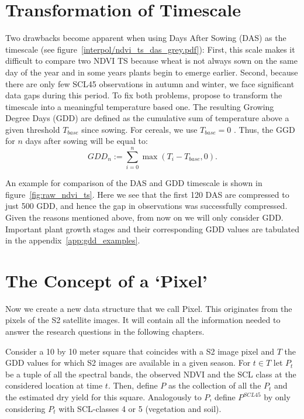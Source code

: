 \section{Transformation of Timescale}\label{sec:gdd_def}
	{%
		Two drawbacks become apparent when using Days After Sowing (DAS) as the timescale (see figure~\ref{interpol/ndvi_ts_das_grey.pdf}): First, this scale makes it difficult to compare two NDVI {TS} because wheat is not always sown on the same day of the year and in some years plants begin to emerge earlier. Second, because there are only few SCL45 observations in autumn and winter, we face significant data gaps during this period. To fix both problems, \cite{mcmasterGrowingDegreedaysOne1997} propose to transform the timescale into a meaningful temperature based one. The resulting Growing Degree Days ({GDD}) are defined as the cumulative sum of temperature above a given threshold $T_{base}$ since sowing. For cereals, we use $T_{base}=0$ \citep{holzkamperSpatialTemporalTrends2015}. Thus, the GGD for $n$ days after sowing will be equal to:
		\begin{equation}
			\label{eq:gdd}
			GDD_n := \sum_{i=0}^n \max(T_i - T_{base}, 0).
		\end{equation}

        An example for comparison of the DAS and GDD timescale is shown in figure~\ref{fig:raw_ndvi_ts}. Here we see that the first 120 DAS are compressed to just 500 GDD, and hence the gap in observations was successfully compressed. Given the reasons mentioned above, from now on we will only consider GDD. 
        Important plant growth stages and their corresponding GDD values are tabulated in the appendix~\ref{app:gdd_examples}.
	} 

\section{The Concept of a `Pixel'}{ \label{sec:gather_data_to_pixel}
	Now we create a new data structure that we call Pixel. This originates from the pixels of the S2 satellite images. It will contain all the information needed to answer the research questions in the following chapters. 
		
		Consider a 10 by 10 meter square that coincides with a S2 image pixel and $T$ the GDD values for which S2 images are available in a given season. For $t\in T$ let $P_t$ be a tuple of all the spectral bands, the observed NDVI and the SCL class at the considered location at time $t$. Then, define $P$ as the collection of all the $P_t$ and the estimated dry yield for this square.
		Analogously to $P$, define $P^{SCL45}$ by only considering $P_t$ with SCL-classes 4 or 5 (vegetation and soil).  
}

